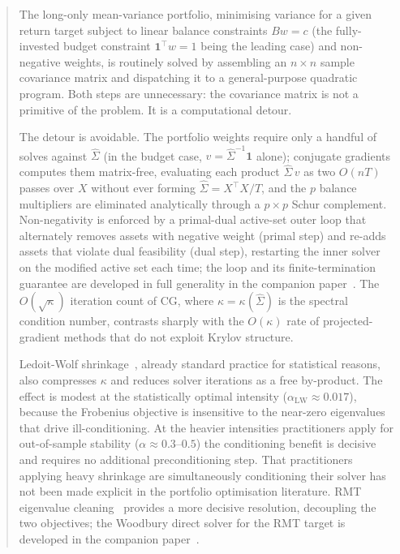 \begin{abstract}
The long-only mean-variance portfolio, minimising variance for a given return target
subject to linear balance constraints $Bw = c$ (the fully-invested budget constraint
$\mathbf{1}^\top w = 1$ being the leading case) and non-negative weights, is routinely
solved by
assembling an $n\times n$ sample covariance matrix and dispatching it to a
general-purpose quadratic program. Both steps are unnecessary: the covariance matrix
is not a primitive of the problem. It is a computational detour.

The detour is avoidable. The portfolio weights require only a handful of solves
against $\hat\Sigma$ (in the budget case, $v = \hat\Sigma^{-1}\mathbf{1}$ alone);
conjugate gradients computes them matrix-free, evaluating each product $\hat\Sigma\,v$
as two $O(nT)$ passes over $X$ without ever forming $\hat\Sigma = X^\top X/T$, and the
$p$ balance multipliers are eliminated analytically through a $p \times p$ Schur
complement.
Non-negativity is enforced by a primal-dual active-set outer loop that alternately
removes assets with negative weight (primal step) and re-adds assets that violate
dual feasibility (dual step), restarting the inner solver on the modified active set
each time; the loop and its finite-termination guarantee are developed in full
generality in the companion paper~\cite{schmelzer2026nncg}. The $O(\sqrt\kappa)$ iteration count of CG, where
$\kappa = \kappa(\hat\Sigma)$ is the spectral condition number, contrasts sharply with
the $O(\kappa)$ rate of projected-gradient methods that do not exploit Krylov structure.

Ledoit-Wolf shrinkage~\cite{ledoit2004}, already standard practice for statistical
reasons, also compresses $\kappa$ and reduces solver iterations as a free by-product.
The effect is modest at the statistically optimal intensity
($\alpha_{\mathrm{LW}} \approx 0.017$), because the Frobenius objective is insensitive
to the near-zero eigenvalues that drive ill-conditioning. At the heavier intensities
practitioners apply for out-of-sample stability ($\alpha \approx 0.3$--$0.5$) the
conditioning benefit is decisive and requires no additional preconditioning step.
That practitioners applying heavy shrinkage are simultaneously conditioning their
solver has not been made explicit in the portfolio optimisation literature.
RMT eigenvalue cleaning~\cite{laloux1999,bun2017} provides a more decisive resolution,
decoupling the two objectives; the Woodbury direct solver for the RMT target is
developed in the companion paper~\cite{schmelzer2026rmt}.


\end{abstract}
